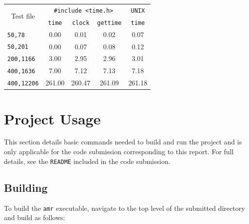 \documentclass{article}
\begin{document}
\begin{minipage}{\linewidth}
\begin{minipage}{0.4\linewidth}
    \end{minipage}
    \hspace{0.02\linewidth}
    \begin{minipage}{0.45\linewidth}
        \centering
        \begin{tabular}{|l|c|c|c|c|}
            \hline
            \multicolumn{1}{|c|}{\multirow{2}{*}{Test file}} & \multicolumn{3}{|c|}{\texttt{\#include <time.h>}} & \texttt{UNIX} \\
            \cline{2-5}
            \multicolumn{1}{|c|}{} & \texttt{time} & \texttt{clock} & \texttt{gettime} & \texttt{time} \\
            \hline
            \hline
            \texttt{50,78}     & 0.00 & 0.01 & 0.02 & 0.07 \\
            \texttt{50,201}    & 0.00 & 0.07 & 0.08 & 0.12 \\
            \texttt{200,1166}  & 3.00 & 2.95 & 2.96 & 3.01 \\
            \texttt{400,1636}  & 7.00 & 7.12 & 7.13 & 7.18 \\
            \texttt{400,12206} & 261.00 & 260.47 & 261.09 & 261.18 \\
            \hline
        \end{tabular}

         \label{tab:runtime}

    \end{minipage}
\end{minipage}

\section*{Project Usage}
\label{sec:project}

This section details basic commands needed to build and run the project and is
only applicable for the code submission corresponding to this report. For full
details, see the \texttt{README} included in the code submission.

\subsection*{Building}
\label{subsec:building}

To build the \texttt{amr} executable, navigate to the top level of the
submitted directory and build as follows:
\end{document}
